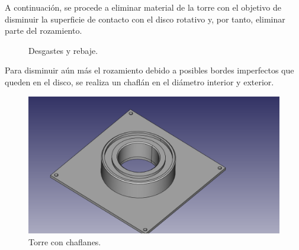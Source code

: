A continuación, se procede a eliminar material de la torre con
el objetivo de disminuir la superficie de contacto con el disco rotativo y, por tanto, eliminar parte del rozamiento.

\begin{figure}[H]
    \centering
    \caption{Desgastes y rebaje.}
    \label{fig:anillo_tapa_superior}
\end{figure}

Para disminuir aún más el rozamiento debido a posibles bordes imperfectos que queden en el disco, se realiza un chaflán en el diámetro interior y exterior.

\begin{figure}[H]
    \centering
    \includegraphics[width=.9\linewidth]{pictures/Chaflanes.png}
    \caption{Torre con chaflanes.}
    \label{fig:chaflanes_tapa_superior}
\end{figure}

